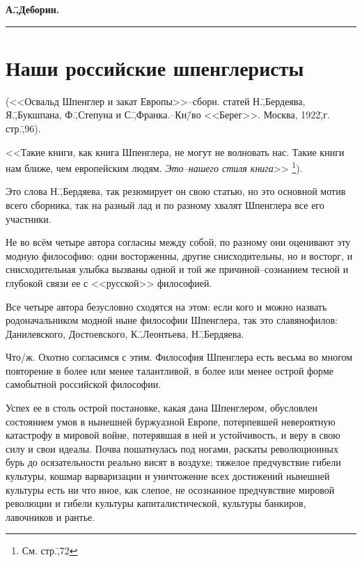 \begin{flushright}
 \textbf{А.\=,Деборин.}\hspace*{2em}
\end{flushright}
\begin{center}
 \vspace{2em}
 \rule{7em}{1pt}
 \vspace{2em}
\end{center}

\section*{Наши российские шпенглеристы}
\label{sec:3}

\begin{center}
\noindent(<<Освальд Шпенглер и закат Европы>>\---сборн. статей Н.\=,Бердеява, Я.\=,Букшпана, Ф.\=,Степуна и С.\=,Франка.\---Кн\=/во <<Берег>>. Москва, 1922\=,г. стр.\=,96).
\end{center}

<<Такие книги, как книга Шпенглера, не могут не волновать нас. Такие книги нам ближе, чем европейским людям. \emph{Это\---нашего стиля книга}>> \footnote{См. стр.\=,72}).

Это слова Н.\=,Бердяева, так резюмирует он свою статью, но это основной мотив всего сборника, так на разный лад и по разному хвалят Шпенглера все его участники.

Не во всём четыре автора согласны между собой, по разному они оценивают эту модную философию: одни восторженны, другие снисходительны, но и восторг, и снисходительная улыбка вызваны одной и той же причиной\---сознанием тесной и глубокой связи ее с <<русской>> философией.

Все четыре автора безусловно сходятся на этом: если кого и можно назвать родоначальником модной ныне философии Шпенглера, так это славянофилов: Данилевского, Достоевского, К.\=,Леонтьева, Н.\=,Бердяева.

Что\-/ж. Охотно согласимся с этим. Философия Шпенглера есть весьма во многом повторение в более или менее талантливой, в более или менее острой форме самобытной российской философии.

Успех ее в столь острой постановке, какая дана Шпенглером, обусловлен состоянием умов в нынешней буржуазной Европе, потерпевшей невероятную катастрофу в мировой войне, потерявшая в ней и устойчивость, и веру в свою силу и свои идеалы. Почва пошатнулась под ногами, раскаты революционных бурь до осязательности реально висят в воздухе; тяжелое предчувствие гибели культуры, кошмар варваризации и уничтожение всех достижений нынешней культуры есть ни что иное, как слепое, не осознанное предчувствие мировой революции и гибели культуры капиталистической, культуры банкиров, лавочников и рантье.

